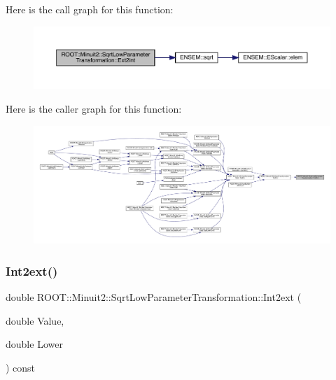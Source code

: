 Here is the call graph for this function\+:
\nopagebreak
\begin{figure}[H]
\begin{center}
\leavevmode
\includegraphics[width=350pt]{df/db9/classROOT_1_1Minuit2_1_1SqrtLowParameterTransformation_a2035002e75f51cafc5e5d8afc05913e6_cgraph}
\end{center}
\end{figure}
Here is the caller graph for this function\+:
\nopagebreak
\begin{figure}[H]
\begin{center}
\leavevmode
\includegraphics[width=350pt]{df/db9/classROOT_1_1Minuit2_1_1SqrtLowParameterTransformation_a2035002e75f51cafc5e5d8afc05913e6_icgraph}
\end{center}
\end{figure}
\mbox{\label{classROOT_1_1Minuit2_1_1SqrtLowParameterTransformation_aaa3325280a05beb0e3f07b542d0aa7d8}} 
\subsubsection{\texorpdfstring{Int2ext()}{Int2ext()}\hspace{0.1cm}{\footnotesize\ttfamily [1/3]}}
{\footnotesize\ttfamily double R\+O\+O\+T\+::\+Minuit2\+::\+Sqrt\+Low\+Parameter\+Transformation\+::\+Int2ext (\begin{DoxyParamCaption}\item[{double}]{Value,  }\item[{double}]{Lower }\end{DoxyParamCaption}) const}


